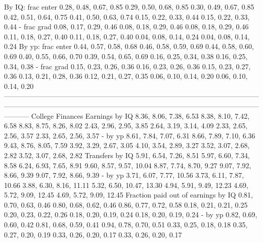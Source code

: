                      By IQ: frac enter      0.28, 0.48, 0.67, 0.85      0.29, 0.50, 0.68, 0.85   0.30, 0.49, 0.67, 0.85     0.42, 0.51, 0.64, 0.75         0.41, 0.50, 0.63, 0.74   0.15, 0.22, 0.33, 0.44   0.15, 0.22, 0.33, 0.44
                           - frac grad      0.08, 0.17, 0.29, 0.46      0.08, 0.18, 0.29, 0.46   0.08, 0.18, 0.29, 0.46     0.11, 0.18, 0.27, 0.40         0.11, 0.18, 0.27, 0.40   0.04, 0.08, 0.14, 0.24   0.04, 0.08, 0.14, 0.24
                     By yp: frac enter      0.44, 0.57, 0.58, 0.68      0.46, 0.58, 0.59, 0.69   0.44, 0.58, 0.60, 0.69     0.40, 0.55, 0.66, 0.70         0.39, 0.54, 0.65, 0.69   0.16, 0.25, 0.34, 0.38   0.16, 0.25, 0.34, 0.38
                           - frac grad      0.15, 0.23, 0.26, 0.36      0.16, 0.23, 0.26, 0.36   0.15, 0.23, 0.27, 0.36     0.13, 0.21, 0.28, 0.36         0.12, 0.21, 0.27, 0.35   0.06, 0.10, 0.14, 0.20   0.06, 0.10, 0.14, 0.20
-----------------------------------------------------------------------------------------------------------------------------------------------------------------------------------------------------------------------------------
                      College Finances                                                                                                                                                                                             
                        Earnings by IQ      8.36, 8.06, 7.38, 6.53      8.38, 8.10, 7.42, 6.58   8.83, 8.75, 8.26, 8.02     2.43, 2.96, 2.95, 3.85         2.64, 3.19, 3.14, 4.09   2.33, 2.65, 2.56, 3.57   2.33, 2.65, 2.56, 3.57
                               - by yp      8.61, 7.84, 7.07, 6.31      8.66, 7.89, 7.10, 6.36   9.43, 8.76, 8.05, 7.59     3.92, 3.29, 2.67, 3.05         4.10, 3.54, 2.89, 3.27   3.52, 3.07, 2.68, 2.82   3.52, 3.07, 2.68, 2.82
                       Transfers by IQ      5.91, 6.54, 7.26, 8.51      5.97, 6.60, 7.34, 8.58   6.24, 6.93, 7.65, 8.91    9.60, 8.57, 9.57, 10.04         8.87, 7.74, 8.70, 9.27   9.07, 7.92, 8.66, 9.39   9.07, 7.92, 8.66, 9.39
                               - by yp     3.71, 6.07, 7.77, 10.56     3.73, 6.11, 7.87, 10.66  3.88, 6.30, 8.16, 11.11   5.32, 6.50, 10.47, 13.30        4.94, 5.91, 9.49, 12.23  4.69, 5.72, 9.09, 12.45  4.69, 5.72, 9.09, 12.45
   Fraction paid out of earnings by IQ      0.81, 0.70, 0.63, 0.46      0.80, 0.68, 0.62, 0.46   0.86, 0.77, 0.72, 0.58     0.18, 0.21, 0.21, 0.25         0.20, 0.23, 0.22, 0.26   0.18, 0.20, 0.19, 0.24   0.18, 0.20, 0.19, 0.24
                               - by yp      0.82, 0.69, 0.60, 0.42      0.81, 0.68, 0.59, 0.41   0.94, 0.78, 0.70, 0.51     0.33, 0.25, 0.18, 0.18         0.35, 0.27, 0.20, 0.19   0.33, 0.26, 0.20, 0.17   0.33, 0.26, 0.20, 0.17
